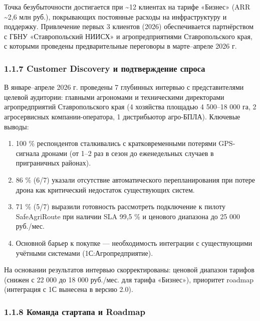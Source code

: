 \documentclass[14pt,a4paper]{extarticle}
\providecommand{\tightlist}{%
  \setlength{\itemsep}{0pt}\setlength{\parskip}{0pt}}
\begin{document}
Точка безубыточности достигается при \textasciitilde12 клиентах на тарифе «Бизнес» (ARR \textasciitilde2,6 млн руб.), покрывающих постоянные расходы на инфраструктуру и поддержку. Привлечение первых 3 клиентов (2026) обеспечивается партнёрством с ГБНУ «Ставропольский НИИСХ» и агропредприятиями Ставропольского края, с которыми проведены предварительные переговоры в марте--апреле 2026 г.

\hypertarget{customer-discovery-ux438-ux43fux43eux434ux442ux432ux435ux440ux436ux434ux435ux43dux438ux435-ux441ux43fux440ux43eux441ux430}{%
\subsubsection{1.1.7 Customer Discovery и подтверждение спроса}\label{customer-discovery-ux438-ux43fux43eux434ux442ux432ux435ux440ux436ux434ux435ux43dux438ux435-ux441ux43fux440ux43eux441ux430}}

В январе--апреле 2026 г. проведены 7 глубинных интервью с представителями целевой аудитории: главными агрономами и техническими директорами агропредприятий Ставропольского края (4 хозяйства площадью 4 500--18 000 га, 2 агросервисных компании-оператора, 1 дистрибьютор агро-БПЛА). Ключевые выводы:

\begin{enumerate}
\def\labelenumi{\arabic{enumi}.}
\tightlist
\item
  100 \% респондентов сталкивались с кратковременными потерями GPS-сигнала дронами (от 1--2 раз в сезон до еженедельных случаев в приграничных районах).
\item
  86 \% (6/7) указали отсутствие автоматического перепланирования при потере дрона как критический недостаток существующих систем.
\item
  71 \% (5/7) выразили готовность рассмотреть подключение к пилоту SafeAgriRoute при наличии SLA 99,5 \% и ценового диапазона до 25 000 руб./мес.
\item
  Основной барьер к покупке --- необходимость интеграции с существующими учётными системами (1С:Агропредприятие).
\end{enumerate}

На основании результатов интервью скорректированы: ценовой диапазон тарифов (снижен с 22 000 до 18 000 руб./мес. для тарифа «Бизнес»), приоритет roadmap (интеграция с 1С вынесена в версию 2.0).

\hypertarget{ux43aux43eux43cux430ux43dux434ux430-ux441ux442ux430ux440ux442ux430ux43fux430-ux438-roadmap}{%
\subsubsection{1.1.8 Команда стартапа и Roadmap}\label{ux43aux43eux43cux430ux43dux434ux430-ux441ux442ux430ux440ux442ux430ux43fux430-ux438-roadmap}}
\end{document}
